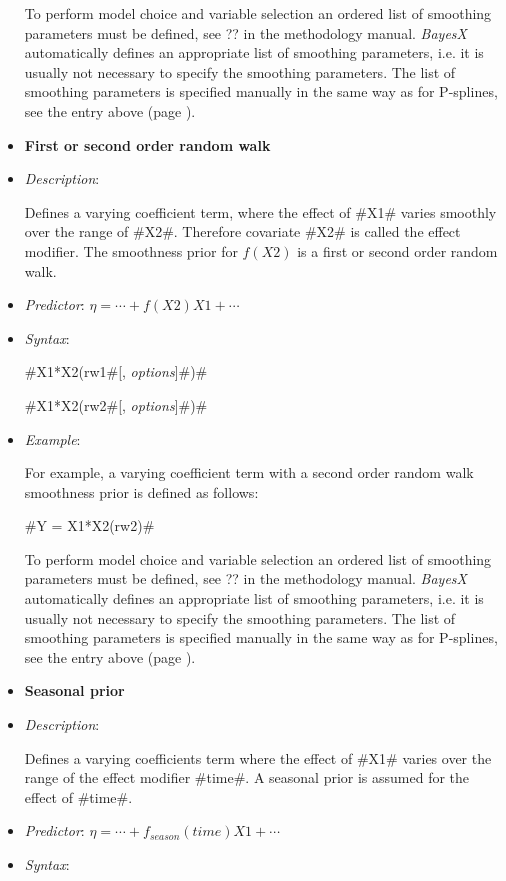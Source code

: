 \begin{itemize}
To perform model choice and variable selection an ordered list of smoothing parameters must be defined, see ??
in the methodology manual. {\em BayesX} automatically defines an appropriate list of smoothing parameters, i.e. it
is usually not necessary to  specify the smoothing parameters.
The list of smoothing parameters is specified manually in the same way as for P-splines,
see the entry above (page \pageref{psplines_stepwise}).
\item[]{\bf\sffamily First or second order random walk}

\item[] {\em Description}:

Defines a varying coefficient term, where the effect of #X1#
varies smoothly over the range of #X2#. Therefore covariate #X2#
is called the effect modifier. The smoothness prior for $f(X2)$ is
a first or second order random walk.
\item[] {\em Predictor}:
$\eta= \cdots + f(X2)X1 + \cdots$ \item[] {\em Syntax}:

#X1*X2(rw1#[, {\em options}]#)#

#X1*X2(rw2#[, {\em options}]#)#
\item[] {\em Example}:

For example, a varying coefficient term with a second order random
walk smoothness prior is defined as follows:

#Y = X1*X2(rw2)#


To perform model choice and variable selection an ordered list of smoothing parameters must be defined, see ??
in the methodology manual. {\em BayesX} automatically defines an appropriate list of smoothing parameters, i.e. it
is usually not necessary to  specify the smoothing parameters.
The list of smoothing parameters is specified manually in the same way as for P-splines,
see the entry above (page \pageref{psplines_stepwise}).
\item[]{\bf\sffamily Seasonal prior}

\item[] {\em Description}:

Defines a varying coefficients term where the effect of #X1#
varies over the range of the effect modifier #time#. A seasonal
prior is assumed for the effect of #time#.

\item[] {\em Predictor}: $\eta= \cdots + f_{season}(time)X1 +
\cdots $ \item[] {\em Syntax}:


\end{itemize}
